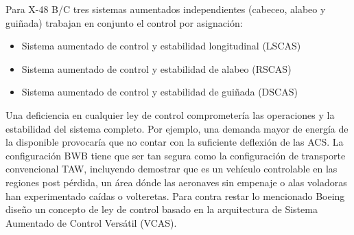 %
Para X-48 B/C tres sistemas aumentados independientes (cabeceo, alabeo y guiñada) trabajan en conjunto el control por asignación:
\begin{itemize}
    \item Sistema aumentado de control y estabilidad longitudinal (LSCAS)
    \item Sistema aumentado de control y estabilidad de alabeo (RSCAS)
    \item Sistema aumentado de control y estabilidad de guiñada (DSCAS)
\end{itemize}
%
Una deficiencia en cualquier ley de control comprometería las operaciones y la estabilidad del sistema completo.
Por ejemplo, una demanda mayor de energía de la disponible provocaría que no contar con la suficiente deflexión de las ACS. 
%
%
La configuración BWB tiene que ser tan segura como la configuración de transporte convencional TAW, incluyendo demostrar que es un vehículo controlable en las regiones post pérdida, un área dónde las aeronaves sin empenaje o alas voladoras han experimentado caídas o volteretas. 
Para contra restar lo mencionado Boeing diseño un concepto de ley de control basado en la arquitectura de Sistema Aumentado de Control Versátil (VCAS).
%
%

